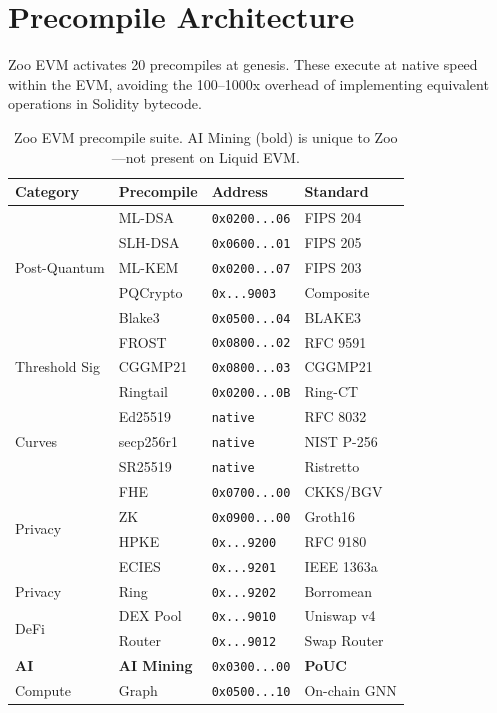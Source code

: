 \documentclass[11pt,a4paper]{article}
\begin{document}
\section{Precompile Architecture}

Zoo EVM activates 20 precompiles at genesis. These execute at native speed within the EVM, avoiding the 100--1000x overhead of implementing equivalent operations in Solidity bytecode.

\begin{table}[h]
\centering
\small
\begin{tabular}{llll}
\toprule
\textbf{Category} & \textbf{Precompile} & \textbf{Address} & \textbf{Standard} \\
\midrule
\multirow{5}{*}{Post-Quantum} & ML-DSA & \texttt{0x0200...06} & FIPS 204 \\
 & SLH-DSA & \texttt{0x0600...01} & FIPS 205 \\
 & ML-KEM & \texttt{0x0200...07} & FIPS 203 \\
 & PQCrypto & \texttt{0x...9003} & Composite \\
 & Blake3 & \texttt{0x0500...04} & BLAKE3 \\
\midrule
\multirow{3}{*}{Threshold Sig} & FROST & \texttt{0x0800...02} & RFC 9591 \\
 & CGGMP21 & \texttt{0x0800...03} & CGGMP21 \\
 & Ringtail & \texttt{0x0200...0B} & Ring-CT \\
\midrule
\multirow{3}{*}{Curves} & Ed25519 & \texttt{native} & RFC 8032 \\
 & secp256r1 & \texttt{native} & NIST P-256 \\
 & SR25519 & \texttt{native} & Ristretto \\
\midrule
\multirow{4}{*}{Privacy} & FHE & \texttt{0x0700...00} & CKKS/BGV \\
 & ZK & \texttt{0x0900...00} & Groth16 \\
 & HPKE & \texttt{0x...9200} & RFC 9180 \\
 & ECIES & \texttt{0x...9201} & IEEE 1363a \\
\midrule
Privacy & Ring & \texttt{0x...9202} & Borromean \\
\midrule
\multirow{2}{*}{DeFi} & DEX Pool & \texttt{0x...9010} & Uniswap v4 \\
 & Router & \texttt{0x...9012} & Swap Router \\
\midrule
\textbf{AI} & \textbf{AI Mining} & \texttt{0x0300...00} & \textbf{PoUC} \\
\midrule
Compute & Graph & \texttt{0x0500...10} & On-chain GNN \\
\bottomrule
\end{tabular}
\caption{Zoo EVM precompile suite. AI Mining (bold) is unique to Zoo---not present on Liquid EVM.}
\end{table}
\end{document}
